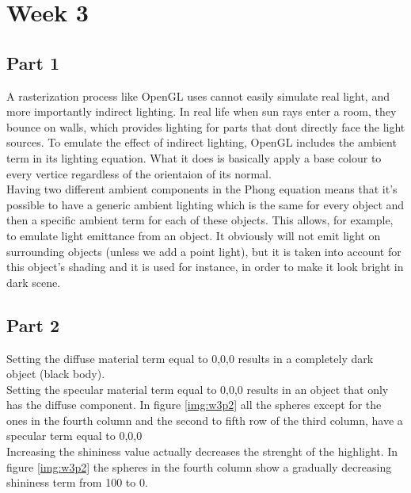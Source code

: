 \chapter{Week 3}

\section{Part 1}

A rasterization process like OpenGL uses cannot easily simulate real light, and
more importantly indirect lighting. In real life when sun rays enter a room, they
bounce on walls, which provides lighting for parts that dont directly face the light
sources. To emulate the effect of indirect lighting, OpenGL includes the ambient
term in its lighting equation. What it does is basically apply a base colour to
every vertice regardless of the orientaion of its normal. \\
Having two different ambient components in the Phong equation means that it's possible to have a generic ambient lighting which
is the same for every object and then a specific ambient term for each of these objects. This allows, for example, to emulate
light emittance from an object. It obviously will not emit light on surrounding objects (unless we add a point light), but it is taken into account for this object's shading and it is used for instance, in order to make it look bright in dark scene. 

\section{Part 2}

Setting the diffuse material term equal to 0,0,0 results in a completely dark object (black body).\\ 
Setting the specular material term equal to 0,0,0 results in an object that only has the diffuse component. In figure \ref{img:w3p2} all the spheres except for the ones in the fourth column and the second to fifth row of the third column, have a specular term equal to 0,0,0\\
Increasing the shininess value actually decreases the strenght of the highlight. In figure \ref{img:w3p2} the spheres in the fourth column show a 
gradually decreasing shininess term from 100 to 0. 


